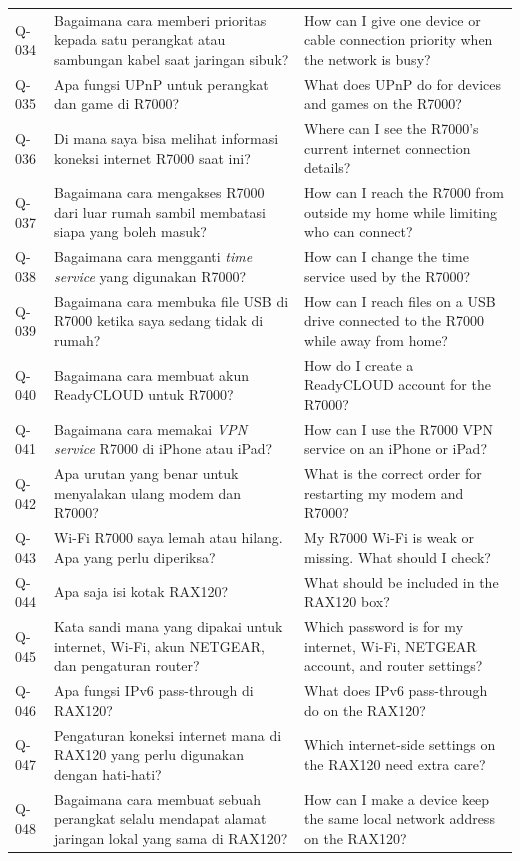 \begin{longtable}{@{}>{\RaggedRight\arraybackslash}p{1.6cm}>{\RaggedRight\arraybackslash}p{5.8cm}>{\RaggedRight\arraybackslash}p{\dimexpr\textwidth-1.6cm-5.8cm-4\tabcolsep\relax}@{}}
Q-034 & Bagaimana cara memberi prioritas kepada satu perangkat atau sambungan kabel saat jaringan sibuk? & How can I give one device or cable connection priority when the network is busy? \\
Q-035 & Apa fungsi UPnP untuk perangkat dan game di R7000? & What does UPnP do for devices and games on the R7000? \\
Q-036 & Di mana saya bisa melihat informasi koneksi internet R7000 saat ini? & Where can I see the R7000's current internet connection details? \\
Q-037 & Bagaimana cara mengakses R7000 dari luar rumah sambil membatasi siapa yang boleh masuk? & How can I reach the R7000 from outside my home while limiting who can connect? \\
Q-038 & Bagaimana cara mengganti \emph{time service} yang digunakan R7000? & How can I change the time service used by the R7000? \\
Q-039 & Bagaimana cara membuka file USB di R7000 ketika saya sedang tidak di rumah? & How can I reach files on a USB drive connected to the R7000 while away from home? \\
Q-040 & Bagaimana cara membuat akun ReadyCLOUD untuk R7000? & How do I create a ReadyCLOUD account for the R7000? \\
Q-041 & Bagaimana cara memakai \emph{VPN service} R7000 di iPhone atau iPad? & How can I use the R7000 VPN service on an iPhone or iPad? \\
Q-042 & Apa urutan yang benar untuk menyalakan ulang modem dan R7000? & What is the correct order for restarting my modem and R7000? \\
Q-043 & Wi-Fi R7000 saya lemah atau hilang. Apa yang perlu diperiksa? & My R7000 Wi-Fi is weak or missing. What should I check? \\
Q-044 & Apa saja isi kotak RAX120? & What should be included in the RAX120 box? \\
Q-045 & Kata sandi mana yang dipakai untuk internet, Wi-Fi, akun NETGEAR, dan pengaturan router? & Which password is for my internet, Wi-Fi, NETGEAR account, and router settings? \\
Q-046 & Apa fungsi IPv6 pass-through di RAX120? & What does IPv6 pass-through do on the RAX120? \\
Q-047 & Pengaturan koneksi internet mana di RAX120 yang perlu digunakan dengan hati-hati? & Which internet-side settings on the RAX120 need extra care? \\
Q-048 & Bagaimana cara membuat sebuah perangkat selalu mendapat alamat jaringan lokal yang sama di RAX120? & How can I make a device keep the same local network address on the RAX120? \\

\end{longtable}
